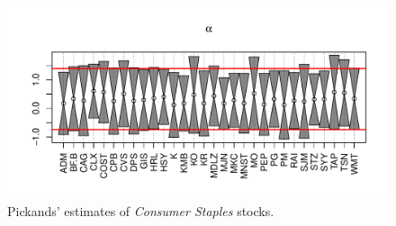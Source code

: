 \documentclass{article}
\newcommand{\1}[1]{
  \mathbf{1}_{\{#1\}}
}
\begin{document}
\begin{figure}[htb!]
  \includegraphics[width=\textwidth]{Consumer_Staples_Pickands.pdf}
  \caption{Pickands' estimates of {\it Consumer Staples} stocks.}
  \label{fig:Consumer_Staples_Pickands}
\end{figure}





\end{document}
